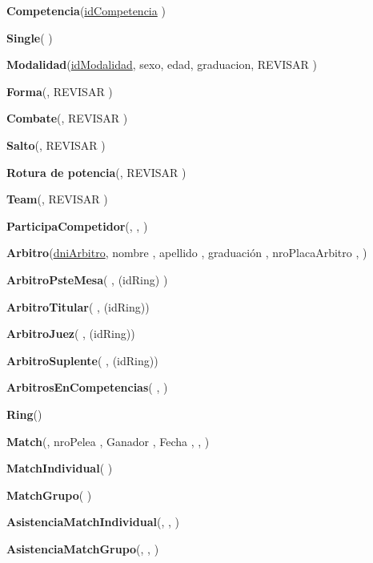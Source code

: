 \textbf{Competencia}(\uline{idCompetencia} )

\textbf{Single}(  )

\textbf{Modalidad}(\uline{idModalidad}, sexo, edad, graduacion, REVISAR )

\textbf{Forma}(, REVISAR  )

\textbf{Combate}(, REVISAR )

\textbf{Salto}(, REVISAR )

\textbf{Rotura de potencia}(, REVISAR )

\textbf{Team}(, REVISAR )

\textbf{ParticipaCompetidor}(, , )

\textbf{Arbitro}(\uline{dniArbitro}, nombre , apellido , graduación , nroPlacaArbitro ,  )

\textbf{ArbitroPsteMesa}( , \dashuline(idRing) )

\textbf{ArbitroTitular}( , \dashuline(idRing))

\textbf{ArbitroJuez}( , \dashuline(idRing))

\textbf{ArbitroSuplente}( , \dashuline(idRing))

\textbf{ArbitrosEnCompetencias}( ,  )

\textbf{Ring}()

\textbf{Match}(, nroPelea , Ganador , Fecha ,  , )

\textbf{MatchIndividual}( )

\textbf{MatchGrupo}( )

\textbf{AsistenciaMatchIndividual}(, ,  )

\textbf{AsistenciaMatchGrupo}(, ,  )
